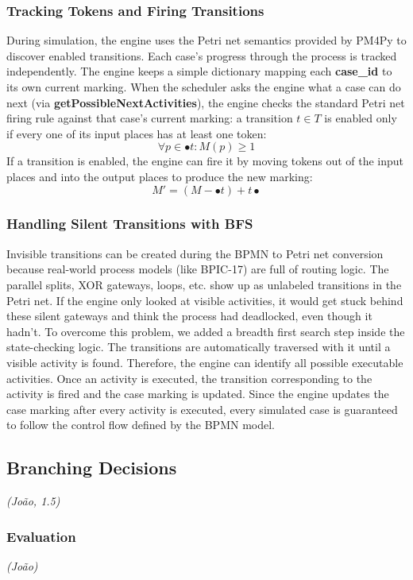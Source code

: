 \documentclass[
  english,
  font=times,
  twocolumn,
]{tumarticle}
\begin{document}
\subsubsection{Tracking Tokens and Firing Transitions}
During simulation, the engine uses the Petri net semantics provided by PM4Py to discover enabled transitions. Each case's progress through the process is tracked independently. The engine keeps a simple dictionary mapping each \textbf{case\_id} to its own current marking. When the scheduler asks the engine what a case can do next (via \textbf{getPossibleNextActivities}), the engine checks the standard Petri net firing rule against that case's current marking: a transition $t \in T$ is enabled only if every one of its input places has at least one token:
$$\forall p \in \bullet t: M(p) \geq 1$$
If a transition is enabled, the engine can fire it by moving tokens out of the input places and into the output places to produce the new marking:
$$M' = (M - \bullet t) + t\bullet$$

\subsubsection{Handling Silent Transitions with BFS}
 Invisible transitions can be created during the BPMN to Petri net conversion because real-world process models (like BPIC-17) are full of routing logic. The parallel splits, XOR gateways, loops, etc. show up as unlabeled transitions in the Petri net. If the engine only looked at visible activities, it would get stuck behind these silent gateways and think the process had deadlocked, even though it hadn't. To overcome this problem, we added a breadth first search step inside the state-checking logic. The transitions are automatically traversed with it until a visible activity is found. Therefore, the engine can identify all possible executable activities. Once an activity is executed, the transition corresponding to the activity is fired and the case marking is updated. Since the engine updates the case marking after every activity is executed, every simulated case is guaranteed to follow the control flow defined by the BPMN model.

\subsection{Branching Decisions}
\textit{(João, 1.5)}\quad


\subsubsection{Evaluation}
\label{ssub:branching-eval}
\textit{(João)}\quad

\end{document}
